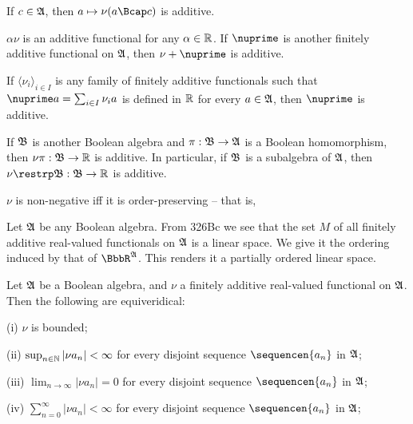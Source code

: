  If $c\in\frak A$, then $a\mapsto\nu(a\Bcap c)$
is additive.

 $\alpha\nu$ is an additive functional
for any
$\alpha\in\Bbb R$.   If $\nuprime$ is another finitely additive functional
on $\frak
A$, then $\nu+\nuprime$ is  additive.

 If $\langle\nu_i\rangle_{i\in I}$ is any family
of finitely additive functionals such that
$\nuprime a=\sum_{i\in I}\nu_i a$ is defined in $\Bbb R$ for every
$a\in \frak A$, then $\nuprime$ is additive.

 If $\frak B$ is another Boolean algebra and
$\pi:\frak B\to\frak A$ is a Boolean homomorphism, then $\nu\pi:\frak
B\to\Bbb R$ is additive.   In particular, if $\frak B$ is a subalgebra
of $\frak A$, then
$\nu\restrp\frak B:\frak B\to\Bbb R$ is  additive.

 $\nu$ is non-negative iff it is
order-preserving -- that is,



 Let $\frak A$ be any
Boolean algebra.   From 326Bc we see that the set $M$ of all finitely
additive real-valued functionals on $\frak A$ is a linear
space.   We give it the ordering
induced by that of $\BbbR^{\frak A}$.   This renders it a partially
ordered linear space.

 Let $\frak A$
be a Boolean algebra, and $\nu$ a finitely additive real-valued
functional on $\frak A$.   Then the following are equiveridical:

(i) $\nu$ is bounded;

(ii) $\sup_{n\in\Bbb N}|\nu a_n|<\infty$ for every disjoint sequence
$\sequencen{a_n}$ in $\frak A$;

(iii) $\lim_{n\to\infty}|\nu a_n|=0$ for every disjoint sequence
$\sequencen{a_n}$ in $\frak A$;

(iv) $\sum_{n=0}^{\infty}|\nu a_n|<\infty$ for every disjoint sequence
$\sequencen{a_n}$ in $\frak A$;

